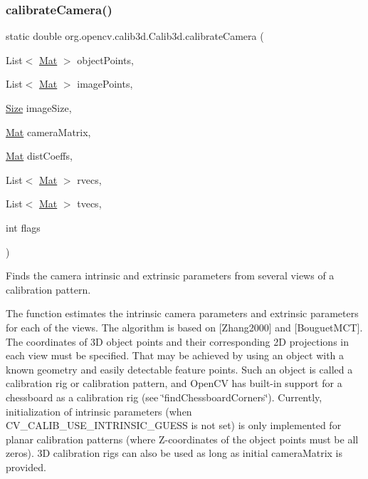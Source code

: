\subsubsection{\texorpdfstring{calibrate\+Camera()}{calibrateCamera()}\hspace{0.1cm}{\footnotesize\ttfamily [2/3]}}
{\footnotesize\ttfamily static double org.\+opencv.\+calib3d.\+Calib3d.\+calibrate\+Camera (\begin{DoxyParamCaption}\item[{List$<$ \mbox{\hyperlink{classorg_1_1opencv_1_1core_1_1_mat}{Mat}} $>$}]{object\+Points,  }\item[{List$<$ \mbox{\hyperlink{classorg_1_1opencv_1_1core_1_1_mat}{Mat}} $>$}]{image\+Points,  }\item[{\mbox{\hyperlink{classorg_1_1opencv_1_1core_1_1_size}{Size}}}]{image\+Size,  }\item[{\mbox{\hyperlink{classorg_1_1opencv_1_1core_1_1_mat}{Mat}}}]{camera\+Matrix,  }\item[{\mbox{\hyperlink{classorg_1_1opencv_1_1core_1_1_mat}{Mat}}}]{dist\+Coeffs,  }\item[{List$<$ \mbox{\hyperlink{classorg_1_1opencv_1_1core_1_1_mat}{Mat}} $>$}]{rvecs,  }\item[{List$<$ \mbox{\hyperlink{classorg_1_1opencv_1_1core_1_1_mat}{Mat}} $>$}]{tvecs,  }\item[{int}]{flags }\end{DoxyParamCaption})\hspace{0.3cm}{\ttfamily [static]}}

Finds the camera intrinsic and extrinsic parameters from several views of a calibration pattern.

The function estimates the intrinsic camera parameters and extrinsic parameters for each of the views. The algorithm is based on \mbox{[}Zhang2000\mbox{]} and \mbox{[}Bouguet\+M\+CT\mbox{]}. The coordinates of 3D object points and their corresponding 2D projections in each view must be specified. That may be achieved by using an object with a known geometry and easily detectable feature points. Such an object is called a calibration rig or calibration pattern, and Open\+CV has built-\/in support for a chessboard as a calibration rig (see \char`\"{}find\+Chessboard\+Corners\char`\"{}). Currently, initialization of intrinsic parameters (when {\ttfamily C\+V\+\_\+\+C\+A\+L\+I\+B\+\_\+\+U\+S\+E\+\_\+\+I\+N\+T\+R\+I\+N\+S\+I\+C\+\_\+\+G\+U\+E\+SS} is not set) is only implemented for planar calibration patterns (where Z-\/coordinates of the object points must be all zeros). 3D calibration rigs can also be used as long as initial {\ttfamily camera\+Matrix} is provided.

